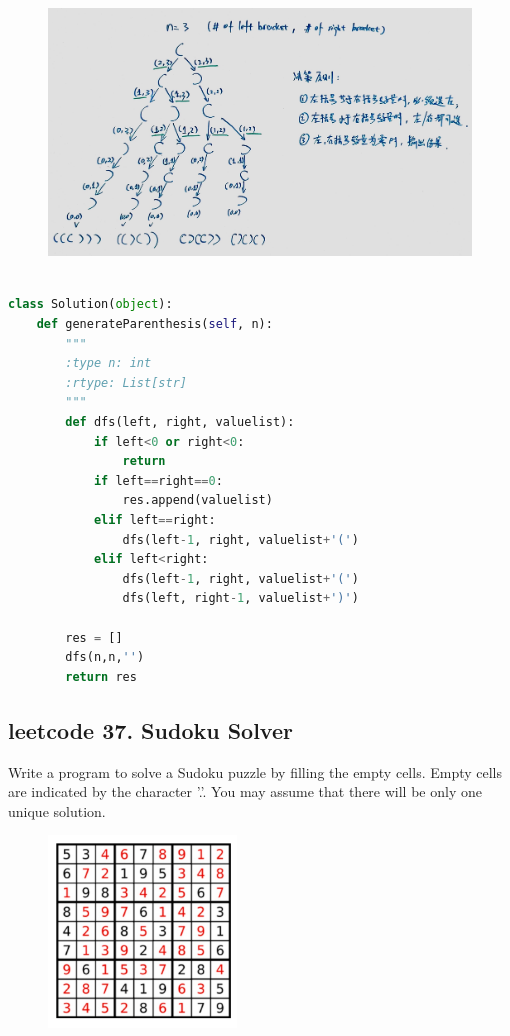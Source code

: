\documentclass[a4paper,10pt]{article}
\begin{document}
\begin{figure}[h]
    \includegraphics[width=1\textwidth]{leetcode22.jpg}
    \centering\\
\end{figure}

\begin{lstlisting}[language=Python, caption=Problem22. Generate Parentheses]

class Solution(object):
    def generateParenthesis(self, n):
        """
        :type n: int
        :rtype: List[str]
        """
        def dfs(left, right, valuelist):
            if left<0 or right<0: 
                return
            if left==right==0: 
                res.append(valuelist)
            elif left==right:
                dfs(left-1, right, valuelist+'(')
            elif left<right:
                dfs(left-1, right, valuelist+'(')
                dfs(left, right-1, valuelist+')')

        res = []
        dfs(n,n,'')
        return res
\end{lstlisting}


\subsection{leetcode 37. Sudoku Solver}
Write a program to solve a Sudoku puzzle by filling the empty cells. Empty cells are indicated by the character '.'. You may assume that there will be only one unique solution.

\begin{figure}[h]
    \includegraphics[width=5cm]{leetcode37-1.jpg}
    \centering
\end{figure}
\end{document}
